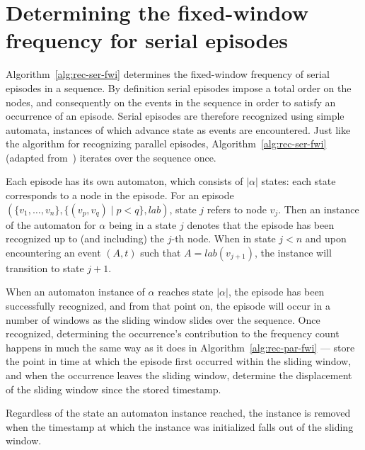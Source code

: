 \section{Determining the fixed-window frequency for serial episodes}
\label{sec:rec-ser-fwi}

Algorithm~\ref{alg:rec-ser-fwi} determines the fixed-window frequency of serial episodes in a sequence. By definition serial episodes impose a total order on the nodes, and consequently on the events in the sequence in order to satisfy an occurrence of an episode. Serial episodes are therefore recognized using simple automata, instances of which advance state as events are encountered. Just like the algorithm for recognizing parallel episodes, Algorithm~\ref{alg:rec-ser-fwi} (adapted from~\cite{mannila1997discovery}) iterates over the sequence once.

Each episode has its own automaton, which consists of $ | \alpha | $ states: each state corresponds to a node in the episode. For an episode $ (\{ v_1, \ldots, v_n \}, \{ (v_p, v_q) \mid p < q \}, lab) $, state $ j $ refers to node $ v_j $. Then an instance of the automaton for $ \alpha $ being in a state $ j $ denotes that the episode has been recognized up to (and including) the $ j $-th node. When in state $ j < n $ and upon encountering an event $ (A, t) $ such that $ A = lab(v_{j + 1}) $, the instance will transition to state $ j + 1 $.

When an automaton instance of $ \alpha $ reaches state $ | \alpha | $, the episode has been successfully recognized, and from that point on, the episode will occur in a number of windows as the sliding window slides over the sequence. Once recognized, determining the occurrence's contribution to the frequency count happens in much the same way as it does in Algorithm~\ref{alg:rec-par-fwi} --- store the point in time at which the episode first occurred within the sliding window, and when the occurrence leaves the sliding window, determine the displacement of the sliding window since the stored timestamp.

Regardless of the state an automaton instance reached, the instance is removed when the timestamp at which the instance was initialized falls out of the sliding window.

